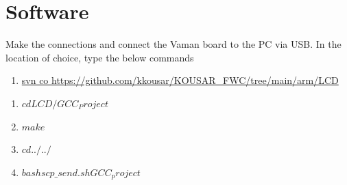 \documentclass[twocolumn,13pt]{article}
\begin{document}
\section*{\large Software}
Make the connections and connect the Vaman board to the PC via USB. In the location of choice, type the below commands
\begin{enumerate}
\item[]\url{svn co https://github.com/kkousar/KOUSAR_FWC/tree/main/arm/LCD}
\end{enumerate}
\begin{enumerate}
\item $cd LCD/GCC_Project$
\item $make$
\item $cd ../../$

\item $bash scp\_send.sh GCC_project$
\end{enumerate}
\end{document}

